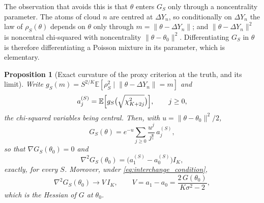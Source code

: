 \documentclass[11pt]{article}
\newtheorem{proposition}[proposition]{Proposition}
\theoremstyle{definition}
\newcommand{\E}{\mathbb{E}}
\newcommand{\thetao}{\theta_0}
\begin{document}
The observation that avoids this is that $\theta$ enters $G_S$ only through a noncentrality parameter. The atoms of cloud $n$ are centred at $\Delta Y_n$, so conditionally on $\Delta Y_n$ the law of $\rho_S(\theta)$ depends on $\theta$ only through $m=\lVert\theta-\Delta Y_n\rVert$; and $\lVert\theta-\Delta Y_n\rVert^2$ is noncentral chi-squared with noncentrality $\lVert\theta-\thetao\rVert^2$. Differentiating $G_S$ in $\theta$ is therefore differentiating a Poisson mixture in its parameter, which is elementary.

\begin{proposition}[Exact curvature of the proxy criterion at the truth, and its limit]\label{prop:curvature}
Write $g_S(m)=S^{2/K}\E[\rho_S^2\mid\lVert\theta-\Delta Y_n\rVert=m]$ and
\begin{equation}\label{eq:a_coefficients}
a_j^{(S)}=\E\Bigl[g_S\bigl(\sqrt{\chi^2_{K+2j}}\bigr)\Bigr],\qquad j\ge0,
\end{equation}
the chi-squared variables being central. Then, with $u=\lVert\theta-\thetao\rVert^2/2$,
\begin{equation}\label{eq:poisson_expansion}
G_S(\theta)=e^{-u}\sum_{j\ge0}\frac{u^j}{j!}\,a_j^{(S)} ,
\end{equation}
so that $\nabla G_S(\thetao)=0$ and
\begin{equation}\label{eq:exact_curvature}
\nabla^2G_S(\thetao)=\bigl(a_1^{(S)}-a_0^{(S)}\bigr)I_K ,
\end{equation}
exactly, for every $S$. Moreover, under \eqref{eq:interchange_condition},
\begin{equation}\label{eq:curvature_limit}
\nabla^2G_S(\thetao)\longrightarrow V\,I_K,
\qquad
V=a_1-a_0=\frac{2\,G(\thetao)}{K\sigma^2-2},
\end{equation}
which is the Hessian of $G$ at $\thetao$.
\end{proposition}
\end{document}
